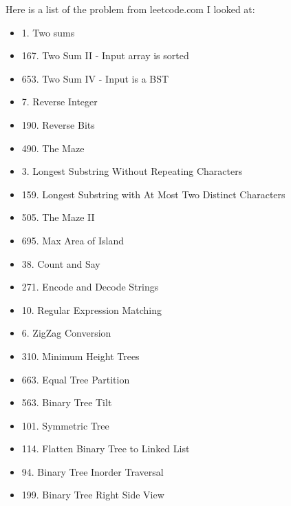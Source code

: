 \documentclass[11pt,a4paper]{article}
\begin{document}
Here is a list of the problem from leetcode.com I looked at:
\begin{itemize}
\item 1. Two sums
\item 167. Two Sum II - Input array is sorted
\item 653. Two Sum IV - Input is a BST
\item 7. Reverse Integer
\item 190. Reverse Bits
\item 490. The Maze
\item 3. Longest Substring Without Repeating Characters
\item 159. Longest Substring with At Most Two Distinct Characters
\item 505. The Maze II
\item 695. Max Area of Island
\item 38. Count and Say
\item 271. Encode and Decode Strings
\item 10. Regular Expression Matching
\item 6. ZigZag Conversion
\item 310. Minimum Height Trees
\item 663. Equal Tree Partition
\item 563. Binary Tree Tilt
\item 101. Symmetric Tree
\item 114. Flatten Binary Tree to Linked List
\item 94. Binary Tree Inorder Traversal
\item 199. Binary Tree Right Side View
\end{itemize}
\end{document}
